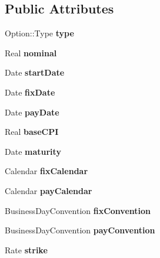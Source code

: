 \subsection*{Public Attributes}
\begin{DoxyCompactItemize}
\item 
Option\+::\+Type {\bfseries type}\label{class_quant_lib_1_1_c_p_i_cap_floor_1_1arguments_a0b80af7d792c381d23d165048c3bcb13}

\item 
Real {\bfseries nominal}\label{class_quant_lib_1_1_c_p_i_cap_floor_1_1arguments_a28b5884383e9f1e6e3cdc473ea99d4b2}

\item 
Date {\bfseries start\+Date}\label{class_quant_lib_1_1_c_p_i_cap_floor_1_1arguments_a7d2dc8a4658f56587b393b8a1284ec8d}

\item 
Date {\bfseries fix\+Date}\label{class_quant_lib_1_1_c_p_i_cap_floor_1_1arguments_aa5b8f1021ac0cd5eea578a6ba9675e08}

\item 
Date {\bfseries pay\+Date}\label{class_quant_lib_1_1_c_p_i_cap_floor_1_1arguments_a5f422a63615442f5be26d05e7241b48b}

\item 
Real {\bfseries base\+C\+PI}\label{class_quant_lib_1_1_c_p_i_cap_floor_1_1arguments_a9de4f70021d1f5b18071fa72b1feb3bf}

\item 
Date {\bfseries maturity}\label{class_quant_lib_1_1_c_p_i_cap_floor_1_1arguments_a053d77e8d9b110e71a134378ee3dfb63}

\item 
Calendar {\bfseries fix\+Calendar}\label{class_quant_lib_1_1_c_p_i_cap_floor_1_1arguments_a9fcf2f0e708752418a028f9666c6d3bd}

\item 
Calendar {\bfseries pay\+Calendar}\label{class_quant_lib_1_1_c_p_i_cap_floor_1_1arguments_a6af062fa3909fdca9c0a6da1bf8b0d26}

\item 
Business\+Day\+Convention {\bfseries fix\+Convention}\label{class_quant_lib_1_1_c_p_i_cap_floor_1_1arguments_aa5ee111b42ee9b1db73a57f5688af7ec}

\item 
Business\+Day\+Convention {\bfseries pay\+Convention}\label{class_quant_lib_1_1_c_p_i_cap_floor_1_1arguments_aa3c86e90bc09ebc477e02aefa6e8ddb2}

\item 
Rate {\bfseries strike}\label{class_quant_lib_1_1_c_p_i_cap_floor_1_1arguments_a3d0e62028e9e2dbee7f19012b6dbd757}


\end{DoxyCompactItemize}
